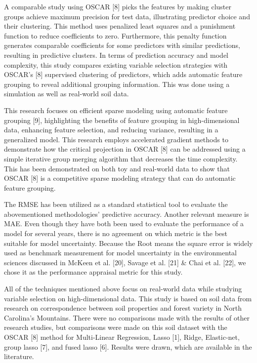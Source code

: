 \documentclass{article} %
\begin{document}
\noindent A comparable study using OSCAR [8] picks the features by making cluster groups achieve maximum precision for test data, illustrating predictor choice and their clustering. This method uses penalized least squares and a punishment function to reduce coefficients to zero. Furthermore, this penalty function generates comparable coefficients for some predictors with similar predictions, resulting in predictive clusters. In terms of prediction accuracy and model complexity, this study compares existing variable selection strategies with OSCAR's [8] supervised clustering of predictors, which adds automatic feature grouping to reveal additional grouping information. This was done using a simulation as well as real-world soil data.

\noindent This research focuses on efficient sparse modeling using automatic feature grouping [9], highlighting the benefits of feature grouping in high-dimensional data, enhancing feature selection, and reducing variance, resulting in a generalized model. This research employs accelerated gradient methods to demonstrate how the critical projection in OSCAR [8] can be addressed using a simple iterative group merging algorithm that decreases the time complexity. This has been demonstrated on both toy and real-world data to show that OSCAR [8] is a competitive sparse modeling strategy that can do automatic feature grouping.

\noindent The RMSE has been utilized as a standard statistical tool to evaluate the abovementioned methodologies' predictive accuracy. Another relevant measure is MAE. Even though they have both been used to evaluate the performance of a model for several years, there is no agreement on which metric is the best suitable for model uncertainty. Because the Root means the square error is widely used as benchmark measurement for model uncertainty in the environmental sciences discussed in McKeen et al. [20], Savage et al. [21] \& Chai et al. [22], we chose it as the performance appraisal metric for this study.

\noindent All of the techniques mentioned above focus on real-world data while studying variable selection on high-dimensional data. This study is based on soil data from research on correspondence between soil properties and forest variety in North Carolina's Mountains. There were no comparisons made with the results of other research studies, but comparisons were made on this soil dataset with the OSCAR [8] method for Multi-Linear Regression, Lasso [1], Ridge, Elastic-net, group lasso [7], and fused lasso [6]. Results were drawn, which are available in the literature.
\end{document}

